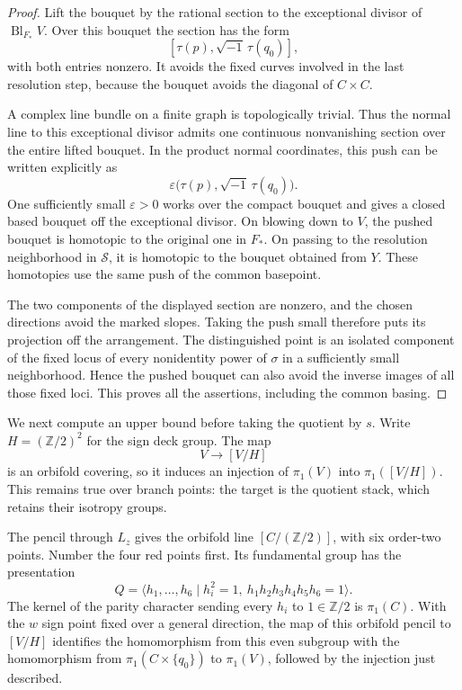 \documentclass[11pt,reqno]{amsart}
\numberwithin{equation}{section}
\theoremstyle{definition}
\theoremstyle{remark}
\begin{document}
\begin{proof}
Lift the bouquet by the rational section to the exceptional divisor of
$\operatorname{Bl}_{F_*}V$.  Over this bouquet the section has the form
\[
 [\tau(p),\sqrt{-1}\,\tau(q_0)],
\]
with both entries nonzero.  It avoids the fixed curves involved in the
last resolution step, because the bouquet avoids the diagonal of
$C\times C$.

A complex line bundle on a finite graph is topologically trivial.
Thus the normal line to this exceptional divisor admits one continuous
nonvanishing section over the entire lifted bouquet.  In the product normal coordinates, this push can be written
explicitly as
\[
 \varepsilon\bigl(\tau(p),\sqrt{-1}\,\tau(q_0)\bigr).
\]
One sufficiently small $\varepsilon>0$ works over the compact bouquet
and gives a closed based bouquet off the exceptional divisor.  On blowing down to $V$, the pushed bouquet is
homotopic to the original one in $F_*$.  On passing to the resolution
neighborhood in $\mathcal S$, it is homotopic to the bouquet obtained from
$Y$.  These homotopies use the same push of the common basepoint.

The two components of the displayed section are nonzero, and the
chosen directions avoid the marked slopes.  Taking the push small
therefore puts its projection off the arrangement.  The distinguished
point is an isolated component of the fixed locus of every nonidentity
power of $\sigma$ in a sufficiently small neighborhood.  Hence the
pushed bouquet can also avoid the inverse images of all those fixed
loci.  This proves all the assertions, including the common basing.
\end{proof}

We next compute an upper bound before taking the quotient by $s$.
Write $H=(\mathbb Z/2)^2$ for the sign deck group.  The map
\[
 V\longrightarrow[V/H]
\]
is an orbifold covering, so it induces an injection of $\pi_1(V)$ into
$\pi_1([V/H])$.  This remains true over branch points: the target is the
quotient stack, which retains their isotropy groups.

The pencil through $L_z$ gives the orbifold line
$[C/(\mathbb Z/2)]$, with six order-two points.  Number the four red points
first.  Its fundamental group has the presentation
\begin{equation}\label{app:pencil-group}
 Q=\langle h_1,\ldots,h_6\mid
       h_i^2=1,\ h_1h_2h_3h_4h_5h_6=1\rangle.
\end{equation}
The kernel of the parity character sending every $h_i$ to $1\in\mathbb Z/2$
is $\pi_1(C)$.  With the $w$ sign point fixed over a general direction,
the map of this orbifold pencil to $[V/H]$ identifies the homomorphism
from this even subgroup with the homomorphism from
$\pi_1(C\times\{q_0\})$ to $\pi_1(V)$, followed by the injection just
described.
\end{document}
